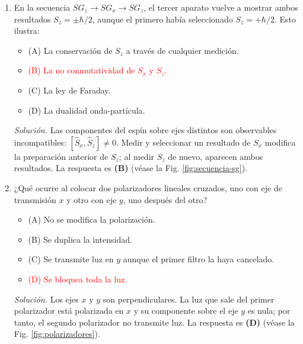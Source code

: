 \documentclass[11pt]{article}
\begin{document}
\begin{enumerate}
    \item En la secuencia $SG_z\to SG_x\to SG_z$, el tercer aparato vuelve a mostrar ambos resultados $S_z=\pm\hbar/2$, aunque el primero había seleccionado $S_z=+\hbar/2$. Esto ilustra:
    \begin{itemize}
        \item (A) La conservación de $S_z$ a través de cualquier medición.
        \item \textcolor{red}{(B) La no conmutatividad de $S_x$ y $S_z$.}
        \item (C) La ley de Faraday.
        \item (D) La dualidad onda-partícula.
    \end{itemize}
    \textit{Solución.} Las componentes del espín sobre ejes distintos son observables incompatibles: $[\hat S_x,\hat S_z]\ne0$. Medir y seleccionar un resultado de $S_x$ modifica la preparación anterior de $S_z$; al medir $S_z$ de nuevo, aparecen ambos resultados. La respuesta es \textbf{(B)} (véase la Fig. \ref{fig:secuencia-sg}). \parencite[Sec. 18.2.5, p. 597]{chaparro2026}
    

    \item ¿Qué ocurre al colocar dos polarizadores lineales cruzados, uno con eje de transmisión $x$ y otro con eje $y$, uno después del otro?
    \begin{itemize}
        \item (A) No se modifica la polarización.
        \item (B) Se duplica la intensidad.
        \item (C) Se transmite luz en $y$ aunque el primer filtro la haya cancelado.
        \item \textcolor{red}{(D) Se bloquea toda la luz.}
    \end{itemize}
    \textit{Solución.} Los ejes $x$ y $y$ son perpendiculares. La luz que sale del primer polarizador está polarizada en $x$ y su componente sobre el eje $y$ es nula; por tanto, el segundo polarizador no transmite luz. La respuesta es \textbf{(D)} (véase la Fig. \ref{fig:polarizadores}). \parencite[Sec. 18.2.2, pp. 586--589]{chaparro2026}


\end{enumerate}
\end{document}
